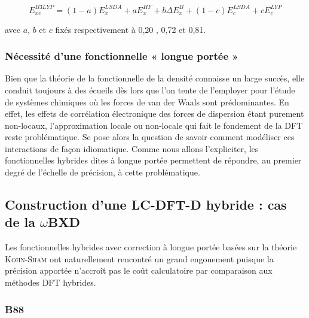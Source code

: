 	\begin{equation}
	E_{xc}^{B3LYP} = (1-a) E_{x}^{LSDA} + a E_{x}^{HF} + b \Delta E_{x}^{B} + (1-c) E_{c}^{LSDA} + c E_{c}^{LYP}
	\label{B3LYP}
	\end{equation}
	
	\noindent avec $a$, $b$ et $c$ fixés respectivement à 0,20 , 0,72 et 0,81.
	
	
	\subsubsection{Nécessité d'une fonctionnelle « longue portée »}
	
	Bien que la théorie de la fonctionnelle de la densité connaisse un large succès, elle conduit toujours à des écueils dès lors que l'on tente de l'employer pour l'étude de systèmes chimiques où les forces de van der Waals sont prédominantes. 
	En effet, les effets de corrélation électronique des forces de dispersion étant purement non-locaux, l'approximation locale ou non-locale qui fait le fondement de la DFT reste problématique. Se pose alors la question de savoir comment modéliser ces interactions de façon idiomatique.
	 Comme nous allons l'expliciter, les fonctionnelles hybrides dites \og à longue portée \fg{} permettent de répondre, au premier degré de l'échelle de précision, à cette problématique. 
	
	
	\subsection[LC-DFT-D hybride : $\omega$BXD]{Construction d'une LC-DFT-D hybride : cas de la $\omega$BXD}
	Les fonctionnelles hybrides avec correction à longue portée basées sur la théorie \textsc{Kohn-Sham} ont naturellement rencontré un grand engouement puisque la précision apportée n'accroît pas le coût calculatoire par comparaison aux méthodes DFT hybrides.
	
	\subsubsection{B88}
	
